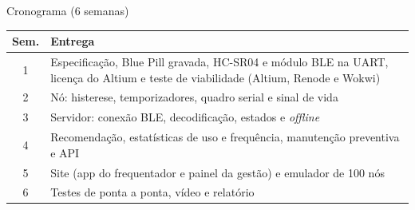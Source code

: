 \documentclass[aspectratio=169,11pt]{beamer}
\begin{document}
\begin{frame}[t]{Cronograma (6 semanas)}
  \renewcommand{\arraystretch}{1.3}
  \footnotesize
  \begin{tabular}{@{}cp{11.3cm}@{}}
    \toprule
    \textbf{Sem.} & \textbf{Entrega} \\
    \midrule
    1 & Especificação, Blue Pill gravada, HC-SR04 e módulo BLE na UART, licença do Altium e teste de viabilidade (Altium, Renode e Wokwi) \\
    2 & Nó: histerese, temporizadores, quadro serial e sinal de vida \\
    3 & Servidor: conexão BLE, decodificação, estados e \emph{offline} \\
    4 & Recomendação, estatísticas de uso e frequência, manutenção preventiva e API \\
    5 & Site (app do frequentador e painel da gestão) e emulador de 100 nós \\
    6 & Testes de ponta a ponta, vídeo e relatório \\
    \bottomrule
  \end{tabular}
\end{frame}
\end{document}
